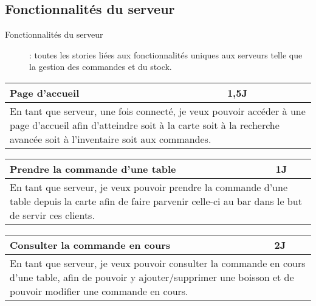 \subsection{Fonctionnalités du serveur}
\begin{description}
	\item[Fonctionnalités du serveur] : toutes les stories liées aux fonctionnalités
	uniques aux serveurs telle que la gestion des commandes et du stock.
\end{description}

\begin{center}
	\begin{tabular}{ll}
		\hline
			\multicolumn{1}{|p{14cm}|}{Page d'accueil} & \multicolumn{1}{p{0.7cm}|}{1,5J} \\ 
		\hline
			\multicolumn{2}{|p{15cm}|}{En tant que serveur, une fois connecté, je veux 
			pouvoir accéder à une page d'accueil afin d'atteindre soit à la carte soit à la 
			recherche avancée soit à l'inventaire soit aux commandes.} \\
		\hline
	\end{tabular}

	\vspace{1cm}
	
	\begin{tabular}{ll}
		\hline
			\multicolumn{1}{|p{14cm}|}{Prendre la commande d'une table} & \multicolumn{1}{p{0.7cm}|}{1J} \\ 
		\hline
			\multicolumn{2}{|p{15cm}|}{En tant que serveur, je veux pouvoir prendre la commande
			d'une table depuis la carte afin de faire parvenir celle-ci au bar dans le but 
			de servir ces clients.} \\
		\hline
	\end{tabular}

	\vspace{1cm}
	
	\begin{tabular}{ll}
		\hline
			\multicolumn{1}{|p{14cm}|}{Consulter la commande en cours} & \multicolumn{1}{p{0.7cm}|}{2J} \\ 
		\hline
			\multicolumn{2}{|p{15cm}|}{En tant que serveur, je veux pouvoir consulter
			la commande en cours d'une table, afin de pouvoir y ajouter/supprimer une
			boisson et de pouvoir modifier une commande en cours.} \\
		\hline
	\end{tabular}


\end{center}
